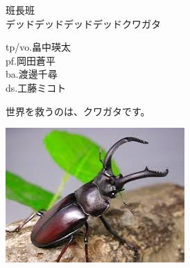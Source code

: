 \documentclass[a4paper]{article}
\begin{document}
\begin{minipage}{\textwidth - 0.25\textheight}
    \flushleft
    \Huge 班長班\\ \huge デッドデッドデッドデッドクワガタ\vspace{1em}\normalsize \\
    \begin{minipage}{15em}
        \flushleft
        \Large
        tp/vo.畠中瑛太\\pf.岡田蒼平\\ba.渡邊千尋\\ds.工藤ミコト
    \end{minipage}
    \begin{minipage}{\textwidth - 18em}
        \flushleft
        \large
        世界を救うのは、クワガタです。
    \end{minipage}
\end{minipage}
\begin{minipage}{0.25\textheight}
    \flushleft
    \includegraphics[width=0.25\textheight]{./FULLHOUSE/resources/20.jpg}
\end{minipage}
\end{document}

